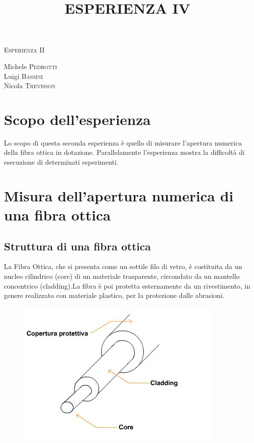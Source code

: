 \documentclass[a4paper,11pt]{article}
\begin{document}
\begin{center}



\textsc{\Huge Esperienza II}\\[0.5cm]



\large
\title{ESPERIENZA IV}

Michele \textsc{Pedrotti}\\
Luigi \textsc{Bassini}\\
Nicola \textsc{Trevisson}\\


\end{center}
\vspace{0.1 cm}
\section{Scopo dell'esperienza}
Lo scopo di questa seconda esperienza è quello di misurare l'apertura numerica della fibra ottica in dotazione. Parallelamente l'esperienza mostra la difficoltà di esecuzione di determinati esperimenti.

\section{Misura dell'apertura numerica di una fibra ottica}
\subsection{Struttura di una fibra ottica}
La Fibra Ottica, che si presenta come un sottile filo di vetro, è costituita da un nucleo cilindrico (core) di un materiale trasparente, circondato da un mantello concentrico (cladding).La fibra è poi protetta esternamente da un rivestimento, in genere realizzato con materiale plastico, per la protezione dalle abrasioni.

 \begin{center} 
\begin{figure}[htpd]
\hspace{90 pt}
\includegraphics[scale=0.90]{fibre_ottiche.jpg}


\end{figure}
\end{center}
\end{document}
